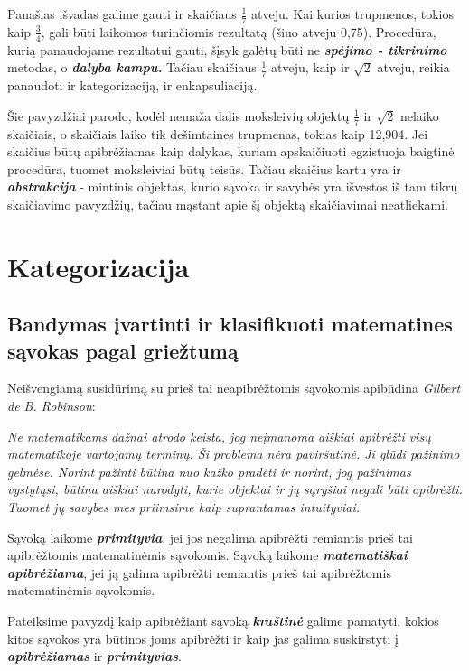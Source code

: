 \documentclass{article}
\begin{document}
Panašias išvadas galime gauti ir skaičiaus $\frac{1}{7}$ atveju. Kai kurios trupmenos, tokios kaip $\frac{3}{4}$, gali būti laikomos turinčiomis rezultatą (šiuo atveju 0,75). Procedūra, kurią panaudojame rezultatui gauti, šįsyk galėtų būti ne \textbf{\textit{spėjimo - tikrinimo}} metodas, o \textbf{\textit{dalyba kampu.}} Tačiau skaičiaus $\frac{1}{7}$ atveju, kaip ir $\sqrt{2}$ atveju, reikia panaudoti ir kategorizaciją, ir enkapsuliaciją. 
 
Šie pavyzdžiai parodo, kodėl nemaža dalis moksleivių objektų $\frac{1}{7}$ ir $\sqrt{2}$ nelaiko skaičiais, o skaičiais laiko tik dešimtaines trupmenas, tokias kaip 12,904. Jei skaičius būtų apibrėžiamas kaip dalykas, kuriam apskaičiuoti egzistuoja baigtinė procedūra, tuomet moksleiviai būtų teisūs. Tačiau skaičius kartu yra ir \textit{\textbf{abstrakcija}} - mintinis objektas, kurio sąvoka ir savybės yra išvestos iš tam tikrų skaičiavimo pavyzdžių, tačiau mąstant apie šį objektą skaičiavimai neatliekami.

\section{Kategorizacija}
\subsection{Bandymas įvartinti ir klasifikuoti matematines sąvokas pagal griežtumą}
Neišvengiamą susidūrimą su prieš tai neapibrėžtomis sąvokomis apibūdina \textit{Gilbert de B. Robinson}:

\textit{Ne matematikams dažnai atrodo keista, jog neįmanoma aiškiai apibrėžti visų matematikoje vartojamų terminų. Ši problema nėra paviršutinė. Ji glūdi pažinimo gelmėse. Norint pažinti būtina nuo kažko pradėti ir norint, jog pažinimas vystytųsi, būtina aiškiai nurodyti, kurie objektai ir jų sąryšiai negali būti apibrėžti. Tuomet jų savybes mes priimsime kaip suprantamas intuityviai.}
\begin{mdframed}[backgroundcolor=blue!10!white, linewidth=3pt]
Sąvoką laikome \textit{\textbf{primityvia}}, jei jos negalima apibrėžti remiantis prieš tai apibrėžtomis matematinėmis sąvokomis. Sąvoką laikome \textit{\textbf{matematiškai apibrėžiama}}, jei ją galima apibrėžti remiantis prieš tai apibrėžtomis matematinėmis sąvokomis. 
\end{mdframed}
Pateiksime pavyzdį kaip apibrėžiant sąvoką \textit{\textbf{kraštinė}} galime pamatyti, kokios kitos sąvokos yra būtinos joms apibrėžti ir kaip jas galima suskirstyti į \textit{\textbf{apibrėžiamas}} ir \textit{\textbf{primityvias}}.
\end{document}
